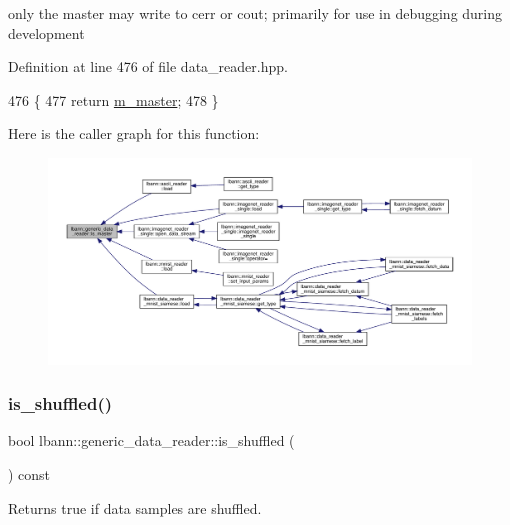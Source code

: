 only the master may write to cerr or cout; primarily for use in debugging during development 



Definition at line 476 of file data\+\_\+reader.\+hpp.


\begin{DoxyCode}
476                          \{
477     \textcolor{keywordflow}{return} \hyperlink{classlbann_1_1generic__data__reader_a52610681839ba81c3050c0881ffc005b}{m\_master};
478   \}
\end{DoxyCode}
Here is the caller graph for this function\+:\nopagebreak
\begin{figure}[H]
\begin{center}
\leavevmode
\includegraphics[width=350pt]{classlbann_1_1generic__data__reader_ae82c40eebc05e2f0c1198afcc7a7f009_icgraph}
\end{center}
\end{figure}
\mbox{\label{classlbann_1_1generic__data__reader_a7d67ce4d10e5cdcdff47f5ecdcee6eb0}} 
\subsubsection{\texorpdfstring{is\+\_\+shuffled()}{is\_shuffled()}}
{\footnotesize\ttfamily bool lbann\+::generic\+\_\+data\+\_\+reader\+::is\+\_\+shuffled (\begin{DoxyParamCaption}{ }\end{DoxyParamCaption}) const\hspace{0.3cm}{\ttfamily [inline]}}

Returns true if data samples are shuffled. 

